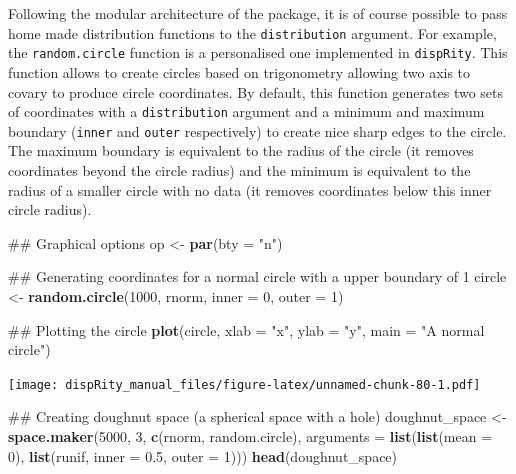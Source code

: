 \documentclass[]{book}
\newenvironment{Shaded}{\begin{snugshade}}{\end{snugshade}}
\newcommand{\KeywordTok}[1]{\textcolor[rgb]{0.13,0.29,0.53}{\textbf{#1}}}
\newcommand{\DataTypeTok}[1]{\textcolor[rgb]{0.13,0.29,0.53}{#1}}
\newcommand{\DecValTok}[1]{\textcolor[rgb]{0.00,0.00,0.81}{#1}}
\newcommand{\FloatTok}[1]{\textcolor[rgb]{0.00,0.00,0.81}{#1}}
\newcommand{\StringTok}[1]{\textcolor[rgb]{0.31,0.60,0.02}{#1}}
\newcommand{\NormalTok}[1]{#1}
\theoremstyle{definition}
\theoremstyle{definition}
\theoremstyle{remark}
\begin{document}
Following the modular architecture of the package, it is of course
possible to pass home made distribution functions to the
\texttt{distribution} argument. For example, the \texttt{random.circle}
function is a personalised one implemented in \texttt{dispRity}. This
function allows to create circles based on trigonometry allowing two
axis to covary to produce circle coordinates. By default, this function
generates two sets of coordinates with a \texttt{distribution} argument
and a minimum and maximum boundary (\texttt{inner} and \texttt{outer}
respectively) to create nice sharp edges to the circle. The maximum
boundary is equivalent to the radius of the circle (it removes
coordinates beyond the circle radius) and the minimum is equivalent to
the radius of a smaller circle with no data (it removes coordinates
below this inner circle radius).

\begin{Shaded}
\begin{Highlighting}[]
\NormalTok{## Graphical options}
\NormalTok{op <-}\StringTok{ }\KeywordTok{par}\NormalTok{(}\DataTypeTok{bty =} \StringTok{"n"}\NormalTok{)}

\NormalTok{## Generating coordinates for a normal circle with a upper boundary of 1}
\NormalTok{circle <-}\StringTok{ }\KeywordTok{random.circle}\NormalTok{(}\DecValTok{1000}\NormalTok{, rnorm, }\DataTypeTok{inner =} \DecValTok{0}\NormalTok{, }\DataTypeTok{outer =} \DecValTok{1}\NormalTok{)}

\NormalTok{## Plotting the circle}
\KeywordTok{plot}\NormalTok{(circle, }\DataTypeTok{xlab =} \StringTok{"x"}\NormalTok{, }\DataTypeTok{ylab =} \StringTok{"y"}\NormalTok{, }\DataTypeTok{main =} \StringTok{"A normal circle"}\NormalTok{)}
\end{Highlighting}
\end{Shaded}

\texttt{[image: dispRity\_manual\_files/figure-latex/unnamed-chunk-80-1.pdf]}

\begin{Shaded}
\begin{Highlighting}[]
\NormalTok{## Creating doughnut space (a spherical space with a hole)}
\NormalTok{doughnut_space <-}\StringTok{ }\KeywordTok{space.maker}\NormalTok{(}\DecValTok{5000}\NormalTok{, }\DecValTok{3}\NormalTok{, }\KeywordTok{c}\NormalTok{(rnorm, random.circle),}
     \DataTypeTok{arguments =} \KeywordTok{list}\NormalTok{(}\KeywordTok{list}\NormalTok{(}\DataTypeTok{mean =} \DecValTok{0}\NormalTok{), }\KeywordTok{list}\NormalTok{(runif, }\DataTypeTok{inner =} \FloatTok{0.5}\NormalTok{, }\DataTypeTok{outer =} \DecValTok{1}\NormalTok{)))}
\KeywordTok{head}\NormalTok{(doughnut_space)}
\end{Highlighting}
\end{Shaded}
\end{document}
